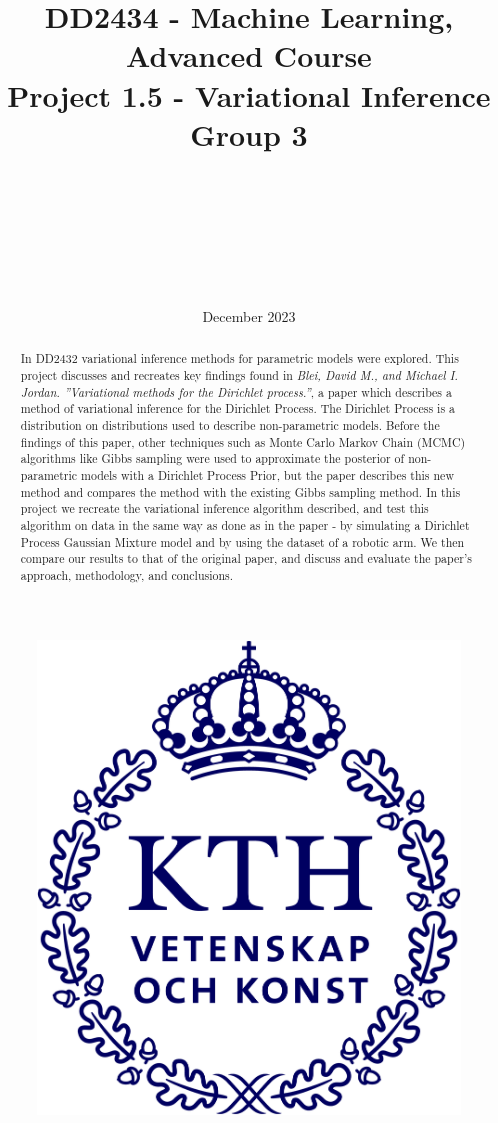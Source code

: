 \documentclass{article}
\title{DD2434 - Machine Learning, Advanced Course \\ Project 1.5 - Variational Inference \\ Group 3}
\author{\authorFst \\ \emailFst \and \authorSnd \\ \emailSnd \and \authorTrd \\ \emailTrd \and \authorFrth \\ \emailFrth}
\date{December 2023}
\begin{document}
\maketitle

\begin{abstract}

    In DD2432 variational inference methods for parametric models were explored. This project discusses and recreates key findings found in \emph{Blei, David M., and Michael I. Jordan. ”Variational methods for the Dirichlet process.”}, a paper which describes a method of variational inference for the Dirichlet Process. The Dirichlet Process is a distribution on distributions used to describe non-parametric models. Before the findings of this paper, other techniques such as Monte Carlo Markov Chain (MCMC) algorithms like Gibbs sampling were used to approximate the posterior of non-parametric models with a Dirichlet Process Prior, but the paper describes this new method and compares the method with the existing Gibbs sampling method. In this project we recreate the variational inference algorithm described, and test this algorithm on data in the same way as done as in the paper - by simulating a Dirichlet Process Gaussian Mixture model and by using the dataset of a robotic arm. We then compare our results to that of the original paper, and discuss and evaluate the paper's approach, methodology, and conclusions.
\end{abstract}

\begin{figure}[b]
    \centering
    \includegraphics[scale=0.2]{KTH_logo_RGB_bla.png}
\end{figure}
\end{document}
